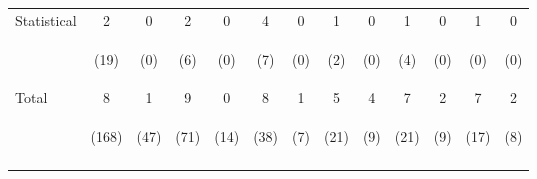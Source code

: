 \begin{tabular}{lcccccccccccc}
\noalign{\smallskip}Statistical & 2 & 0 & 2 & 0 & 4 & 0 & 1 & 0 & 1 & 0 & 1 & 0\\
 & \begin{footnotesize}(19)\end{footnotesize} & \begin{footnotesize}(0)\end{footnotesize} & \begin{footnotesize}(6)\end{footnotesize} & \begin{footnotesize}(0)\end{footnotesize} & \begin{footnotesize}(7)\end{footnotesize} & \begin{footnotesize}(0)\end{footnotesize} & \begin{footnotesize}(2)\end{footnotesize} & \begin{footnotesize}(0)\end{footnotesize} & \begin{footnotesize}(4)\end{footnotesize} & \begin{footnotesize}(0)\end{footnotesize} & \begin{footnotesize}(0)\end{footnotesize} & \begin{footnotesize}(0)\end{footnotesize}\\
\noalign{\smallskip}Total & 8 & 1 & 9 & 0 & 8 & 1 & 5 & 4 & 7 & 2 & 7 & 2\\
 & \begin{footnotesize}(168)\end{footnotesize} & \begin{footnotesize}(47)\end{footnotesize} & \begin{footnotesize}(71)\end{footnotesize} & \begin{footnotesize}(14)\end{footnotesize} & \begin{footnotesize}(38)\end{footnotesize} & \begin{footnotesize}(7)\end{footnotesize} & \begin{footnotesize}(21)\end{footnotesize} & \begin{footnotesize}(9)\end{footnotesize} & \begin{footnotesize}(21)\end{footnotesize} & \begin{footnotesize}(9)\end{footnotesize} & \begin{footnotesize}(17)\end{footnotesize} & \begin{footnotesize}(8)\end{footnotesize}\\
\noalign{\smallskip}\hline\end{tabular}\\
